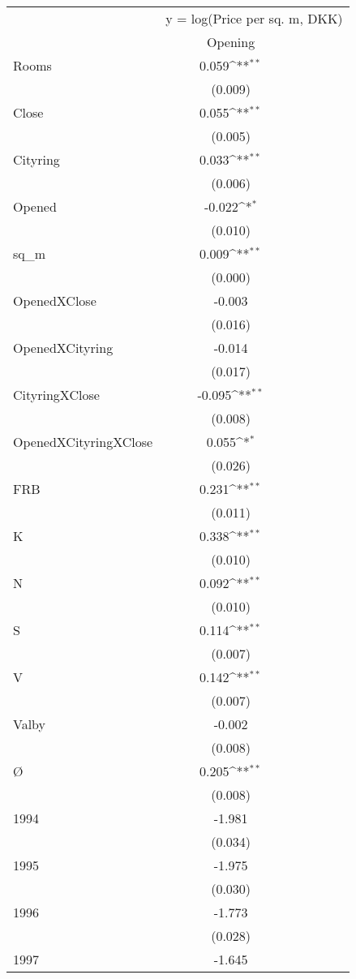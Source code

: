{
\def\sym#1{\ifmmode^{#1}\else\(^{#1}\)\fi}
\begin{tabular}{@{\extracolsep{2pt}}l*{1}{c}@{}}
\hline\hline
& \multicolumn{3}{c}{y = log(Price per sq. m, DKK)} \\
\cline{2-4}
 & Opening \\
\hline
Rooms & 0.059\sym{**} \\
 & (0.009) \\
Close & 0.055\sym{**} \\
 & (0.005) \\
Cityring & 0.033\sym{**} \\
 & (0.006) \\
Opened & -0.022\sym{*} \\
 & (0.010) \\
sq\_m & 0.009\sym{**} \\
 & (0.000) \\
OpenedXClose & -0.003 \\
 & (0.016) \\
OpenedXCityring & -0.014 \\
 & (0.017) \\
CityringXClose & -0.095\sym{**} \\
 & (0.008) \\
OpenedXCityringXClose & 0.055\sym{*} \\
 & (0.026) \\
FRB & 0.231\sym{**} \\
 & (0.011) \\
K & 0.338\sym{**} \\
 & (0.010) \\
N & 0.092\sym{**} \\
 & (0.010) \\
S & 0.114\sym{**} \\
 & (0.007) \\
V & 0.142\sym{**} \\
 & (0.007) \\
Valby & -0.002 \\
 & (0.008) \\
Ø & 0.205\sym{**} \\
 & (0.008) \\
1994 & -1.981 \\
 & (0.034) \\
1995 & -1.975 \\
 & (0.030) \\
1996 & -1.773 \\
 & (0.028) \\
1997 & -1.645 \\

\end{tabular}}
